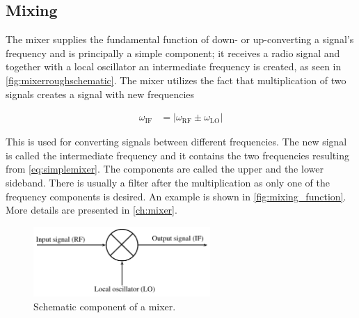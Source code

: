 		\subsection{Mixing}

			The mixer supplies the fundamental function of down- or up-converting a signal's frequency and is principally a simple component; it receives a radio signal and together with a local oscillator an intermediate frequency is created, as seen in \autoref{fig:mixerroughschematic}. The mixer utilizes the fact that multiplication of two signals creates a signal with new frequencies

			\begin{align}\label{eq:simplemixer}
				\omega_\text{IF} &= |\omega_\text{RF}\pm\omega_\text{LO}|
			\end{align}

			This is used for converting signals between different frequencies. The new signal is called the intermediate frequency and it contains the two frequencies resulting from \autoref{eq:simplemixer}. The components are called the upper and the lower sideband. There is usually a filter after the multiplication as only one of the frequency components is desired. An example is shown in \autoref{fig:mixing_function}. More details are presented in \autoref{ch:mixer}.

			\begin{figure}[hbt!]
				\centering
				\includegraphics[width=0.6\textwidth]{fig/mixer/mixer.pdf}
				\caption{Schematic component of a mixer.}\label{fig:mixerroughschematic}
			\end{figure}

